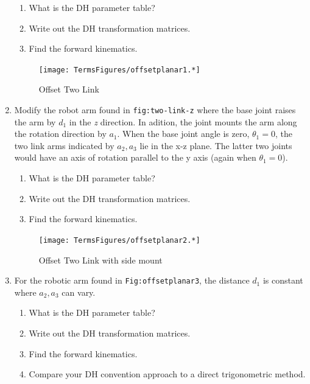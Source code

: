 \begin{enumerate}
  \begin{enumerate}
  \tightlist
  \item
    What is the DH parameter table?
  \item
    Write out the DH transformation matrices.
  \item
    Find the forward kinematics.
  \end{enumerate}

  \leavevmode\hypertarget{Fig:offsetplanar1}{}%
  \begin{figure}
  \centering
  \texttt{[image: TermsFigures/offsetplanar1.*]}
  \caption{Offset Two Link}
  \end{figure}
\item
  Modify the robot arm found in \texttt{fig:two-link-z} where the base
  joint raises the arm by \(d_1\) in the \emph{z} direction. In adition,
  the joint mounts the arm along the rotation direction by \(a_1\). When
  the base joint angle is zero, \(\theta_1=0\), the two link arms
  indicated by \(a_2, a_3\) lie in the x-z plane. The latter two joints
  would have an axis of rotation parallel to the y axis (again when
  \(\theta_1=0\)).

  \begin{enumerate}
  \tightlist
  \item
    What is the DH parameter table?
  \item
    Write out the DH transformation matrices.
  \item
    Find the forward kinematics.
  \end{enumerate}

  \leavevmode\hypertarget{Fig:offsetplanar2}{}%
  \begin{figure}
  \centering
  \texttt{[image: TermsFigures/offsetplanar2.*]}
  \caption{Offset Two Link with side mount}
  \end{figure}
\item
  For the robotic arm found in \texttt{Fig:offsetplanar3}, the distance
  \(d_1\) is constant where \(a_2, a_3\) can vary.

  \begin{enumerate}
  \tightlist
  \item
    What is the DH parameter table?
  \item
    Write out the DH transformation matrices.
  \item
    Find the forward kinematics.
  \item
    Compare your DH convention approach to a direct trigonometric
    method.
  \end{enumerate}


\end{enumerate}
